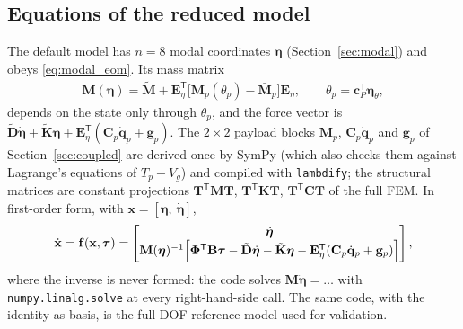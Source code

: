 \documentclass[10pt,a4paper]{article}
\numberwithin{equation}{section}
\begin{document}
\subsection{Equations of the reduced model}
The default model has $n = 8$ modal coordinates $\boldsymbol\eta$ (Section~\ref{sec:modal}) and obeys \eqref{eq:modal_eom}. Its mass matrix
\begin{gather}
\mathbf M(\boldsymbol\eta) = \tilde{\mathbf M} + \mathbf E_\eta^{\mathsf T}\bigl[\mathbf M_p(\theta_p) - \bar{\mathbf M}_p\bigr]\mathbf E_\eta,\qquad \theta_p = \mathbf c_P^{\mathsf T}\boldsymbol\eta_\theta,
\end{gather}
depends on the state only through $\theta_p$, and the force vector is $\tilde{\mathbf D}\dot{\boldsymbol\eta} + \tilde{\mathbf K}\boldsymbol\eta + \mathbf E_\eta^{\mathsf T}(\mathbf C_p\dot{\mathbf q}_p + \mathbf g_p)$. The $2\times2$ payload blocks $\mathbf M_p$, $\mathbf C_p\dot{\mathbf q}_p$ and $\mathbf g_p$ of Section~\ref{sec:coupled} are derived once by SymPy (which also checks them against Lagrange's equations of $T_p - V_g$) and compiled with \texttt{lambdify}; the structural matrices are constant projections $\mathbf T^{\mathsf T}\mathbf M\mathbf T$, $\mathbf T^{\mathsf T}\mathbf K\mathbf T$, $\mathbf T^{\mathsf T}\mathbf C\mathbf T$ of the full FEM. In first-order form, with $\mathbf x = [\boldsymbol\eta,\ \dot{\boldsymbol\eta}]$,
\begin{gather}
\dot{\mathbf x} = \mathbf f(\mathbf x,\boldsymbol\tau) = \begin{bmatrix}\dot{\boldsymbol\eta}\\ \mathbf M(\boldsymbol\eta)^{-1}\Bigl[\boldsymbol\Phi^{\mathsf T}\mathbf B\boldsymbol\tau - \tilde{\mathbf D}\dot{\boldsymbol\eta} - \tilde{\mathbf K}\boldsymbol\eta - \mathbf E_\eta^{\mathsf T}(\mathbf C_p\dot{\mathbf q}_p + \mathbf g_p)\Bigr]\end{bmatrix},
\end{gather}
where the inverse is never formed: the code solves $\mathbf M\ddot{\boldsymbol\eta} = \dots$ with \texttt{numpy.linalg.solve} at every right-hand-side call. The same code, with the identity as basis, is the full-DOF reference model used for validation.
\end{document}
